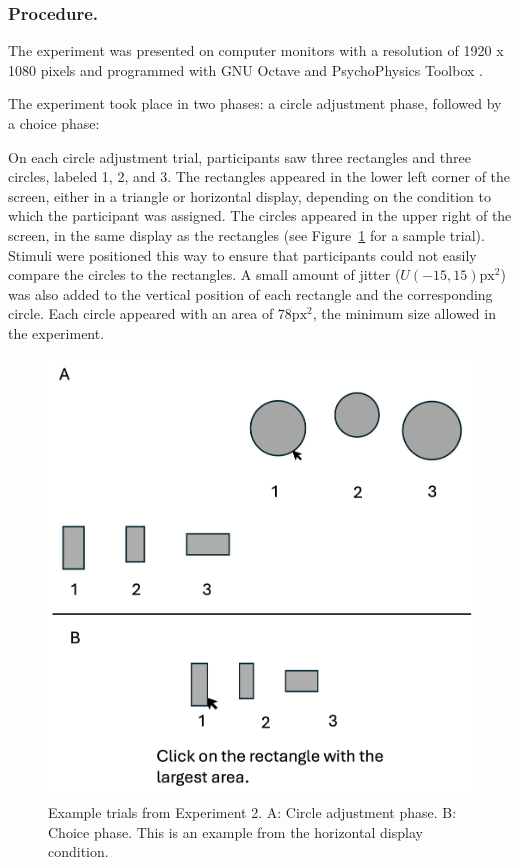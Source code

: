 \subsubsection{Procedure.}

The experiment was presented on computer monitors with a resolution of 1920 x 1080 pixels and programmed with GNU Octave \parencite{octave} and PsychoPhysics Toolbox \parencite{brainardPsychophysicsToolbox1997}. 

The experiment took place in two phases: a circle adjustment phase, followed by a choice phase: 

On each circle adjustment trial, participants saw three rectangles and three circles, labeled 1, 2, and 3. The rectangles appeared in the lower left corner of the screen, either in a triangle or horizontal display, depending on the condition to which the participant was assigned. The circles appeared in the upper right of the screen, in the same display as the rectangles (see Figure~\ref{fig:circle_exp_display} for a sample trial). Stimuli were positioned this way to ensure that participants could not easily compare the circles to the rectangles. A small amount of jitter ($U(-15,15)\text{px}^2$) was also added to the vertical position of each rectangle and the corresponding circle. Each circle appeared with an area of $78 \text{px}^2$, the minimum size allowed in the experiment. 

\begin{figure}
   \includegraphics[width=\linewidth]{figures/circle_exp_display.jpg}
   \caption{Example trials from Experiment 2. A: Circle adjustment phase. B: Choice phase. This is an example from the horizontal display condition.}
   \label{fig:circle_exp_display}
\end{figure}

